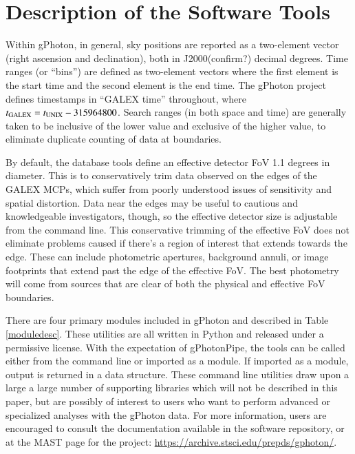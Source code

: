 \documentclass[5p]{elsarticle}
\begin{document}
\section{Description of the Software Tools}
\label{softwaretools}
Within gPhoton, in general, sky positions are reported as a two-element vector (right ascension and declination), both in {\color{red}J2000(confirm?)} decimal degrees. Time ranges (or ``bins'') are defined as two-element vectors where the first element is the start time and the second element is the end time. The gPhoton project defines timestamps in ``GALEX time'' throughout, where $t_{\rm{GALEX}} = t_{\rm{UNIX}} - 315964800$. Search ranges (in both space and time) are generally taken to be inclusive of the lower value and exclusive of the higher value, to eliminate duplicate counting of data at boundaries.

By default, the database tools define an effective detector FoV 1.1 degrees in diameter. This is to conservatively trim data observed on the edges of the GALEX MCPs, which suffer from poorly understood issues of sensitivity and spatial distortion. Data near the edges may be useful to cautious and knowledgeable investigators, though, so the effective detector size is adjustable from the command line. This conservative trimming of the effective FoV does not eliminate problems caused if there's a region of interest that extends towards the edge.  These can include photometric apertures, background annuli, or image footprints that extend past the edge of the effective FoV.  The best photometry will come from sources that are clear of both the physical and effective FoV boundaries.

There are four primary modules included in gPhoton and described in Table \ref{moduledesc}. These utilities are all written in Python and released under a permissive license. With the expectation of gPhotonPipe, the tools can be called either from the command line or imported as a module. If imported as a module, output is returned in a data structure. These command line utilities draw upon a large a large number of supporting libraries which will not be described in this paper, but are possibly of interest to users who want to perform advanced or specialized analyses with the gPhoton data.  For more information, users are encouraged to consult the documentation available in the software repository, or at the MAST page for the project: \url{https://archive.stsci.edu/prepds/gphoton/}.
\end{document}
